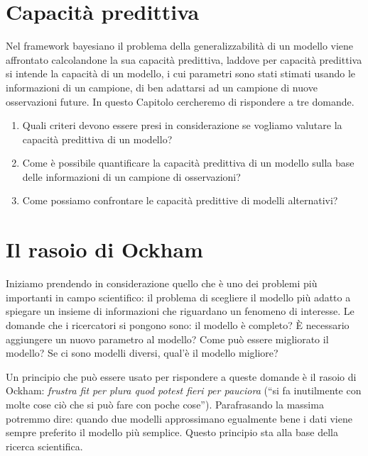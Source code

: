 \documentclass[
  10pt,
  italian,
  a4paper,
  extrafontsizes,onecolumn,openright
  ]{memoir}
\providecommand{\tightlist}{%
  \setlength{\itemsep}{0pt}\setlength{\parskip}{0pt}}
\theoremstyle{definition}
\theoremstyle{definition}
\theoremstyle{definition}
\theoremstyle{definition}
\theoremstyle{remark}
\begin{document}
\hypertarget{capacituxe0-predittiva}{%
\section{Capacità predittiva}\label{capacituxe0-predittiva}}

Nel framework bayesiano il problema della generalizzabilità di un modello viene affrontato calcolandone la sua capacità predittiva, laddove per capacità predittiva si intende la capacità di un modello, i cui parametri sono stati stimati usando le informazioni di un campione, di ben adattarsi ad un campione di nuove osservazioni future. In questo Capitolo cercheremo di rispondere a tre domande.

\begin{enumerate}
\def\labelenumi{\arabic{enumi}.}
\tightlist
\item
  Quali criteri devono essere presi in considerazione se vogliamo valutare la capacità predittiva di un modello?
\item
  Come è possibile quantificare la capacità predittiva di un modello sulla base delle informazioni di un campione di osservazioni?
\item
  Come possiamo confrontare le capacità predittive di modelli alternativi?
\end{enumerate}

\hypertarget{il-rasoio-di-ockham}{%
\section{Il rasoio di Ockham}\label{il-rasoio-di-ockham}}

Iniziamo prendendo in considerazione quello che è uno dei problemi più importanti in campo scientifico: il problema di scegliere il modello più adatto a spiegare un insieme di informazioni che riguardano un fenomeno di interesse. Le domande che i ricercatori si pongono sono: il modello è completo? È necessario aggiungere un nuovo parametro al modello? Come può essere migliorato il modello? Se ci sono modelli diversi, qual'è il modello migliore?

Un principio che può essere usato per rispondere a queste domande è il rasoio di Ockham: \emph{frustra fit per plura quod potest fieri per pauciora} (``si fa inutilmente con molte cose ciò che si può fare con poche cose''). Parafrasando la massima potremmo dire: quando due modelli approssimano egualmente bene i dati viene sempre preferito il modello più semplice. Questo principio sta alla base della ricerca scientifica.
\end{document}

